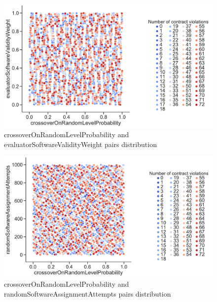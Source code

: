 \begin{figure}
	\centering
	\includegraphics[width=\textwidth]{images/PairsDistr/crossoverOnRandomLevelProbability_evaluatorSoftwareValidityWeight.pdf}
	\caption[crossoverOnRandomLevelProbability and evaluatorSoftwareValidityWeight pairs distribution]{crossoverOnRandomLevelProbability and evaluatorSoftwareValidityWeight pairs distribution} 
	\label{fig:crossoverOnRandomLevelProbability_evaluatorSoftwareValidityWeight_pair}
\end{figure}
\begin{figure}
	\centering
	\includegraphics[width=\textwidth]{images/PairsDistr/crossoverOnRandomLevelProbability_randomSoftwareAssignmentAttempts.pdf}
	\caption[crossoverOnRandomLevelProbability and randomSoftwareAssignmentAttempts pairs distribution]{crossoverOnRandomLevelProbability and randomSoftwareAssignmentAttempts pairs distribution}
	\label{fig:crossoverOnRandomLevelProbability_randomSoftwareAssignmentAttempts_pair}
\end{figure}
